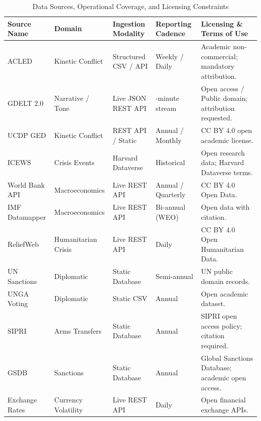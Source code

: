 \documentclass[preprint,12pt]{elsarticle}
\begin{document}
\begin{table}[htbp]
\centering
\footnotesize
\caption{Data Sources, Operational Coverage, and Licensing Constraints}
\label{tab:sources}
\begin{tabularx}{\textwidth}{>{\raggedright\arraybackslash\hsize=0.95\hsize}X >{\raggedright\arraybackslash\hsize=0.95\hsize}X >{\raggedright\arraybackslash\hsize=1.05\hsize}X >{\raggedright\arraybackslash\hsize=0.85\hsize}X >{\raggedright\arraybackslash\hsize=1.20\hsize}X}
\toprule
\textbf{Source Name} & \textbf{Domain} & \textbf{Ingestion Modality} & \textbf{Reporting Cadence} & \textbf{Licensing \& Terms of Use} \\
\midrule
ACLED & Kinetic Conflict & Structured CSV / API & Weekly / Daily & Academic non-commercial; mandatory attribution. \\
GDELT 2.0 & Narrative / Tone & Live JSON REST API & 15-minute stream & Open access / Public domain; attribution requested. \\
UCDP GED & Kinetic Conflict & REST API / Static & Annual / Monthly & CC BY 4.0 open academic license. \\
ICEWS & Crisis Events & Harvard Dataverse & Historical & Open research data; Harvard Dataverse terms. \\
World Bank API & Macroeconomics & Live REST API & Annual / Quarterly & CC BY 4.0 Open Data. \\
IMF Datamapper & Macroeconomics & Live REST API & Bi-annual (WEO) & Open data with citation. \\
ReliefWeb & Humanitarian Crisis & Live REST API & Daily & CC BY 4.0 Open Humanitarian Data. \\
UN Sanctions & Diplomatic & Static Database & Semi-annual & UN public domain records. \\
UNGA Voting & Diplomatic & Static CSV & Annual & Open academic dataset. \\
SIPRI & Arms Transfers & Static Database & Annual & SIPRI open access policy; citation required. \\
GSDB & Sanctions & Static Database & Annual & Global Sanctions Database; academic open access. \\
Exchange Rates & Currency Volatility & Live REST API & Daily & Open financial exchange APIs. \\
\bottomrule
\end{tabularx}
\end{table}

\end{document}
